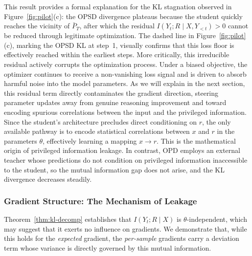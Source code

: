 \documentclass[]{jingdong}
\begin{document}
This result provides a formal explanation for the KL stagnation observed in Figure~\ref{fig:pilot}(c): the OPSD divergence plateaus because the student quickly reaches the vicinity of $\bar{P}_T$, after which the residual $I(Y_t; R \mid X, Y_{<t}) > 0$ cannot be reduced through legitimate optimization. The dashed line in Figure~\ref{fig:pilot}(c), marking the OPSD KL at step~1, visually confirms that this loss floor is effectively reached within the earliest steps. More critically, this irreducible residual actively corrupts the optimization process. Under a biased objective, the optimizer continues to receive a non-vanishing loss signal and is driven to absorb harmful noise into the model parameters. As we will explain in the next section, this residual term directly contaminates the gradient direction, steering parameter updates away from genuine reasoning improvement and toward encoding spurious correlations between the input and the privileged information. Since the student's architecture precludes direct conditioning on $r$, the only available pathway is to encode statistical correlations between $x$ and $r$ in the parameters $\theta$, effectively learning a mapping $x \to r$. This is the mathematical origin of privileged information leakage. In contrast, OPD employs an external teacher whose predictions do not condition on privileged information inaccessible to the student, so the mutual information gap does not arise, and the KL divergence decreases steadily.




\subsubsection{Gradient Structure: The Mechanism of Leakage}
\label{sec:gradient-structure}

Theorem~\ref{thm:kl-decomp} establishes that $I(Y_t; R \mid X)$ is $\theta$-independent, which may suggest that it exerts no influence on gradients. We demonstrate that, while this holds for the \textit{expected} gradient, the \textit{per-sample} gradients carry a deviation term whose variance is directly governed by this mutual information.
\end{document}
